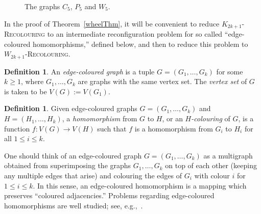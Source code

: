 \documentclass[11 pt]{amsart}
\theoremstyle{definition}
\newtheorem{defn}[equation]{Definition}
\theoremstyle{case}
\numberwithin{equation}{section}
\newcommand\Hrec[1]{\textsc{$#1$-Recolouring}}
\begin{document}
\begin{figure}[htbp]


\caption{The graphs $C_5$, $P_5$ and $W_5$.}
\label{C5P5W5Fig}
\end{figure}

In the proof of Theorem~\ref{wheelThm}, it will be convenient to reduce \Hrec{K_{2k+1}} to an intermediate reconfiguration problem for so called ``edge-coloured homomorphisms,'' defined below, and then to reduce this problem to \Hrec{W_{2k+1}}. 

\begin{defn}
An \emph{edge-coloured graph} is a tuple $G=(G_1,\dots,G_k)$ for some $k\geq1$, where $G_1,\dots, G_k$ are graphs with the same vertex set. The \emph{vertex set} of $G$ is taken to be $V(G):=V(G_1)$. 
\end{defn}

\begin{defn}
Given edge-coloured graphs $G=(G_1,\dots, G_k)$ and $H=(H_1,\dots, H_k)$, a \emph{homomorphism} from $G$ to $H$, or an \emph{$H$-colouring} of $G$, is a function $f:V(G)\to V(H)$ such that $f$ is a homomorphism from $G_i$ to $H_i$ for all $1\leq i\leq k$. 
\end{defn}

One should think of an edge-coloured graph $G=(G_1,\dots,G_k)$ as a multigraph obtained from  superimposing the graphs $G_1,\dots, G_k$ on top of each other (keeping any multiple edges that arise) and colouring the edges of $G_i$ with colour $i$ for $1\leq i\leq k$. In this sense, an edge-coloured homomorphism is a mapping which preserves ``coloured adjacencies.'' Problems regarding edge-coloured homomorphisms are well studied; see, e.g.,~\cite{RickThesis, signed17, Alon, BrewRel}. 
\end{document}
